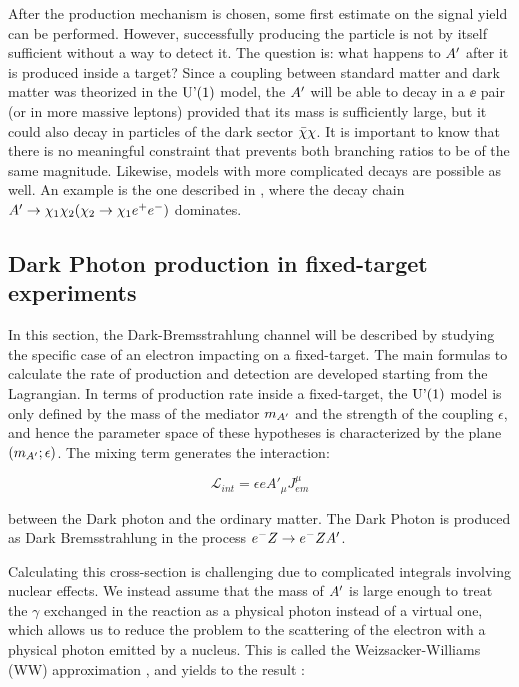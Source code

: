 After the production mechanism is chosen, some first estimate on the signal yield can be performed. However, successfully producing the particle is not by itself sufficient without a way to detect it. The question is: what happens to $A'$ after it is produced inside a target? Since a coupling between standard matter and dark matter was theorized in the $\textrm{U'(1)}$ model, the $A'$ will be able to decay in a $\ee$ pair (or in more massive leptons) provided that its mass is sufficiently large, but it could also decay in particles of the dark sector $\bar{\chi} \chi$. It is important to know that there is no meaningful constraint that prevents both branching ratios to be of the same magnitude. Likewise, models with more complicated decays are possible as well. An example is the one described in \cite{Mohlabeng_2019}, where the decay chain $A' \to \chi_1 \chi_2(\chi_2 \to \chi_1 e^+e^-)$ dominates. 

\subsection{Dark Photon production in fixed-target experiments}
\label{ch1:sec:dm-u1model}

In this section, the Dark-Bremsstrahlung channel will be described by studying the specific case of an electron impacting on a fixed-target. The main formulas to calculate the rate of production and detection are developed starting from the Lagrangian. In terms of production rate inside a fixed-target, the $\textrm{U'(1)}$ model is only defined by the mass of the mediator $m_{A'}$ and the strength of the coupling $\epsilon$, and hence the parameter space of these hypotheses is characterized by the plane $(m_{A'};\epsilon)$. The mixing term generates the interaction:

\begin{equation}
  \label{eq:dm-interaction}
  \mathcal{L}_{int} = \epsilon e A'_{\mu}J^{\mu}_{em}
\end{equation}

between the Dark photon and the ordinary matter. The Dark Photon is produced as Dark Bremsstrahlung in the process $e^- Z \to e^- Z A'$.

Calculating this cross-section is challenging due to complicated integrals involving nuclear effects. We instead assume that the mass of $A'$ is large enough to treat the $\gamma$ exchanged in the reaction as a physical photon instead of a virtual one, which allows us to reduce the problem to the scattering of the electron with a physical photon emitted by a nucleus. This is called the Weizsacker-Williams (WW) approximation \cite{Kim:1973he}, and yields to the result \cite{jdb}:

